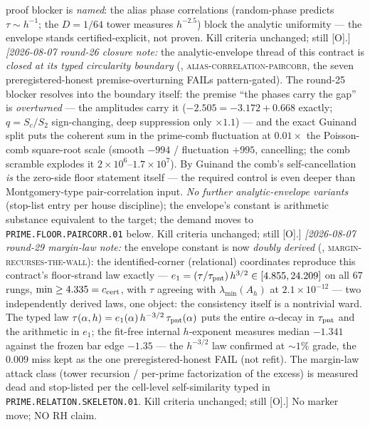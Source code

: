 \documentclass[11pt,a4paper]{article}
\begin{document}
{proof blocker is \emph{named}: the alias phase correlations
(random-phase predicts $\tau \sim h^{-1}$; the $D = 1/64$ tower
measures $h^{-2.5}$) block the analytic uniformity --- the
envelope stands certified-explicit, not proven.  Kill criteria
unchanged; still [O].]
\emph{[2026-08-07 round-26 closure note:} the analytic-envelope
thread of this contract is \emph{closed at its typed circularity
boundary} (,
\textsc{alias-correlation-paircorr}, the seven
preregistered-honest premise-overturning FAILs pattern-gated).
The round-25 blocker resolves into the boundary itself: the
premise ``the phases carry the gap'' is \emph{overturned} --- the
amplitudes carry it ($-2.505 = -3.172 + 0.668$ exactly;
$q = S_c/S_2$ sign-changing, deep suppression only $\times1.1$)
--- and the exact Guinand split puts the coherent sum in the
prime-comb fluctuation at $0.01\times$ the Poisson-comb
square-root scale (smooth $-994$ / fluctuation $+995$,
cancelling; the comb scramble explodes it
$2\times10^6$--$1.7\times10^7$).  By Guinand the comb's
self-cancellation \emph{is} the zero-side floor statement itself
--- the required control is even deeper than Montgomery-type
pair-correlation input.  \emph{No further analytic-envelope
variants} (stop-list entry per house discipline); the envelope's
constant is arithmetic substance equivalent to the target; the
demand moves to \texttt{PRIME.FLOOR.PAIRCORR.01} below.  Kill
criteria unchanged; still [O].]
\emph{[2026-08-07 round-29 margin-law note:} the envelope
constant is now \emph{doubly derived}
(,
\textsc{margin-recurses-the-wall}): the identified-corner
(relational) coordinates reproduce this contract's floor-strand
law exactly --- $e_1 = (\tau/\tau_{\rm pnt})\,h^{3/2} \in
[4.855, 24.209]$ on all $67$ rungs, $\min \ge 4.335 =
c_{\rm cert}$, with $\tau$ agreeing with $\lambda_{\min}(A_h)$
at $2.1\times10^{-12}$ --- two independently derived laws, one
object: the consistency itself is a nontrivial ward.  The typed
law $\tau(\alpha, h) = e_1(\alpha)\, h^{-3/2}\,
\tau_{\rm pnt}(\alpha)$ puts the entire $\alpha$-decay in
$\tau_{\rm pnt}$ and the arithmetic in $e_1$; the fit-free
internal $h$-exponent measures median $-1.341$ against the
frozen bar edge $-1.35$ --- the $h^{-3/2}$ law confirmed at
$\sim1\%$ grade, the $0.009$ miss kept as the one
preregistered-honest FAIL (not refit).  The margin-law attack
class (tower recursion / per-prime factorization of the excess)
is measured dead and stop-listed per the cell-level
self-similarity typed in \texttt{PRIME.RELATION.SKELETON.01}.
Kill criteria unchanged; still [O].]
No marker move; NO RH claim.\par}
\end{document}
